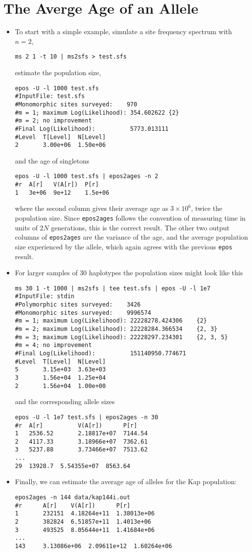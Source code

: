 \documentclass[a4paper, english]{article}
\newcommand{\ty}{\texttt}
\begin{document}
\section{The Averge Age of an Allele}
\begin{itemize}
  \item To start with a simple example, simulate a site frequency spectrum with $n=2$,
\begin{verbatim}
ms 2 1 -t 10 | ms2sfs > test.sfs
\end{verbatim}
estimate the population size,
\begin{verbatim}
epos -U -l 1000 test.sfs
#InputFile:	test.sfs
#Monomorphic sites surveyed:	970
#m = 1; maximum Log(Likelihood): 354.602622	{2}
#m = 2; no improvement
#Final Log(Likelihood):          5773.013111
#Level  T[Level]  N[Level]
2       3.00e+06  1.50e+06
\end{verbatim}
and the age of singletons
\begin{verbatim}
epos -U -l 1000 test.sfs | epos2ages -n 2
#r  A[r]   V(A[r])  P[r]
1   3e+06  9e+12    1.5e+06
\end{verbatim}
where the second column gives their average age as $3\times 10^6$,
twice the population size. Since \ty{epos2ages} follows the convention
of measuring time in units of $2N$ generations, this is the correct
result. The other two output columns of \ty{epos2ages} are the
variance of the age, and the average population size experienced by
the allele, which again agrees with the previous \ty{epos} result.
\item For larger samples of 30 haplotypes the population sizes might look like this
\begin{verbatim}
ms 30 1 -t 1000 | ms2sfs | tee test.sfs | epos -U -l 1e7
#InputFile:	stdin
#Polymorphic sites surveyed:	3426
#Monomorphic sites surveyed:	9996574
#m = 1; maximum Log(Likelihood): 22228278.424306	{2}
#m = 2; maximum Log(Likelihood): 22228284.366534	{2, 3}
#m = 3; maximum Log(Likelihood): 22228297.234301	{2, 3, 5}
#m = 4; no improvement
#Final Log(Likelihood):          151140950.774671
#Level  T[Level]  N[Level]
5       3.15e+03  3.63e+03
3       1.56e+04  1.25e+04
2       1.56e+04  1.00e+00
\end{verbatim}
and the corresponding allele sizes
\begin{verbatim}
epos -U -l 1e7 test.sfs | epos2ages -n 30
#r  A[r]          V(A[r])      P[r]
1   2536.52       2.18817e+07  7144.54
2   4117.33       3.18966e+07  7362.61
3   5237.88       3.73466e+07  7513.62
...
29  13928.7  5.54355e+07  8563.64
\end{verbatim}
\item Finally, we can estimate the average age of alleles for the Kap
  population:
\begin{verbatim}
epos2ages -n 144 data/kap144i.out
#r      A[r]    V(A[r])      P[r]
1       232151  4.18264e+11  1.38013e+06
2       382824  6.51857e+11  1.4013e+06
3       493525  8.05644e+11  1.41684e+06
...
143     3.13086e+06  2.09611e+12  1.60264e+06
\end{verbatim}  
\end{itemize}
\end{document}
